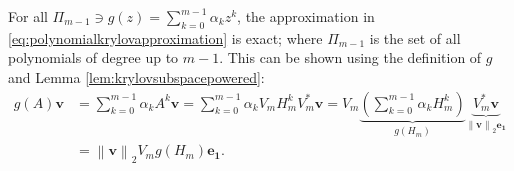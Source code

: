 \begin{corollary}
    \label{cor:univariateerrorestimationpolynomial}
    For all $\Pi_{m-1} \ni g(z) = \sum_{k=0}^{m-1}{\alpha_k} z^k$, the approximation
    in \eqref{eq:polynomialkrylovapproximation} is exact;
    where $\Pi_{m-1}$ is the set of all polynomials of degree up to $m-1$.
    This can be shown using the definition of $g$ and Lemma \ref{lem:krylovsubspacepowered}:
    \begin{equation*}
        \begin{aligned}
            g(A) \mathbf{v} & = \sum_{k=0}^{m-1}{\alpha_k A^k \mathbf{v}}
            = \sum_{k=0}^{m-1}{\alpha_k V_m H_m^k V_m^* \mathbf{v}}
            = V_m \underset{g(H_m)}{\underbrace{\left( \sum_{k=0}^{m-1}{\alpha_k H_m^k } \right)}}
            \underset{\left\| \mathbf{v} \right\|_2 \mathbf{e_1}}{\underbrace{V_m^* \mathbf{v}}}\\
            & = \left\| \mathbf{v} \right\|_2 V_m g(H_m) \mathbf{e_1}.
        \end{aligned}
    \end{equation*}
\end{corollary}

